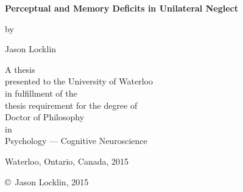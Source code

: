 

\pagestyle{empty}

\begin{titlepage}
        \begin{center}
        \vspace*{1.0cm}

        \Huge
        {\bf Perceptual and Memory Deficits in Unilateral Neglect }

        \vspace*{1.0cm}

        \normalsize
        by \\

        \vspace*{1.0cm}

        \Large
        Jason Locklin \\

        \vspace*{3.0cm}

        \normalsize
        A thesis \\
        presented to the University of Waterloo \\ 
        in fulfillment of the \\
        thesis requirement for the degree of \\
	Doctor of Philosophy\\
        in \\
        Psychology --- Cognitive Neuroscience\\

        \vspace*{2.0cm}

        Waterloo, Ontario, Canada, 2015 \\

        \vspace*{1.0cm}

        \copyright\ Jason Locklin, 2015 \\
        \end{center}
\end{titlepage}

\doublespacing
\pagestyle{plain}
\setcounter{page}{2}

